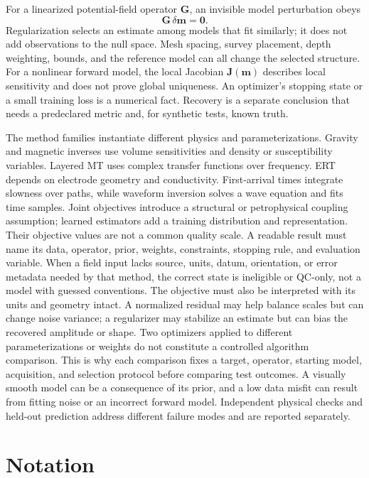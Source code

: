 For a linearized potential-field operator $\mathbf G$, an invisible
model perturbation obeys
\begin{equation}\label{eq:linear-nullspace}
 \mathbf G\,\delta\mathbf m=\mathbf 0.
\end{equation}
Regularization selects an estimate among models that fit similarly; it
does not add observations to the null space. Mesh spacing, survey
placement, depth weighting, bounds, and the reference model can all
change the selected structure. For a nonlinear forward model, the local
Jacobian $\mathbf J(\mathbf m)$ describes local sensitivity and does
not prove global uniqueness. An optimizer's stopping state or a small
training loss is a numerical fact. Recovery is a separate conclusion
that needs a predeclared metric and, for synthetic tests, known truth.

The method families instantiate different physics and parameterizations.
Gravity and magnetic inverses use volume sensitivities and density or
susceptibility variables. Layered MT uses complex transfer functions
over frequency. ERT depends on electrode geometry and conductivity.
First-arrival times integrate slowness over paths, while waveform
inversion solves a wave equation and fits time samples. Joint objectives
introduce a structural or petrophysical coupling assumption; learned
estimators add a training distribution and representation. Their
objective values are not a common quality scale. A readable result must
name its data, operator, prior, weights, constraints, stopping rule, and
evaluation variable. When a field input lacks source, units, datum,
orientation, or error metadata needed by that method, the correct state
is ineligible or QC-only, not a model with guessed conventions.
The objective must also be interpreted with its units and geometry
intact. A normalized residual may help balance scales but can change
noise variance; a regularizer may stabilize an estimate but can bias
the recovered amplitude or shape. Two optimizers applied to different
parameterizations or weights do not constitute a controlled algorithm
comparison. This is why each comparison fixes a target, operator,
starting model, acquisition, and selection protocol before comparing
test outcomes. A visually smooth model can be a consequence of its prior,
and a low data misfit can result from fitting noise or an incorrect
forward model. Independent physical checks and held-out prediction
address different failure modes and are reported separately.

\section{Notation}\label{notation}

